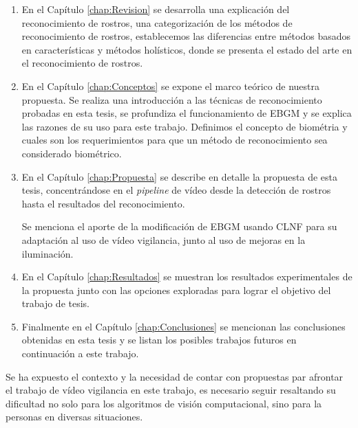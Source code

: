 \begin{enumerate}
\item En el Capítulo \ref{chap:Revision} se desarrolla una explicación del reconocimiento de rostros, una categorización de los métodos de reconocimiento de rostros, establecemos las diferencias entre métodos basados en características y métodos holísticos, donde se presenta el estado del arte en el reconocimiento de rostros.

\item En el Capítulo \ref{chap:Conceptos} se expone el marco teórico de nuestra propuesta. 
Se realiza una introducción a las técnicas de reconocimiento probadas en esta tesis, se profundiza el funcionamiento de \ac{EBGM} y se explica las razones de su uso para este trabajo. Definimos el concepto de biométria y cuales son los requerimientos para que un método de reconocimiento sea considerado biométrico.

\item En el Capítulo \ref{chap:Propuesta} se describe en detalle la propuesta de esta tesis, concentrándose en el \textit{pipeline} de vídeo desde la detección de rostros hasta el resultados del reconocimiento.

Se menciona el aporte de la modificación de \ac{EBGM} usando \ac{CLNF} para su adaptación al uso de vídeo vigilancia, junto al uso de mejoras en la iluminación.

\item En el Capítulo \ref{chap:Resultados} se muestran los resultados experimentales de la propuesta junto con las opciones exploradas para lograr el objetivo del trabajo de tesis.

\item Finalmente en el Capítulo \ref{chap:Conclusiones} se mencionan las conclusiones obtenidas en esta tesis y se listan los posibles trabajos futuros en continuación a este trabajo.
\end{enumerate}

Se ha expuesto el contexto y la necesidad de contar con propuestas par afrontar el trabajo de vídeo vigilancia en este trabajo, es necesario seguir resaltando su dificultad no solo para los algoritmos de visión computacional, sino para la personas en diversas situaciones.